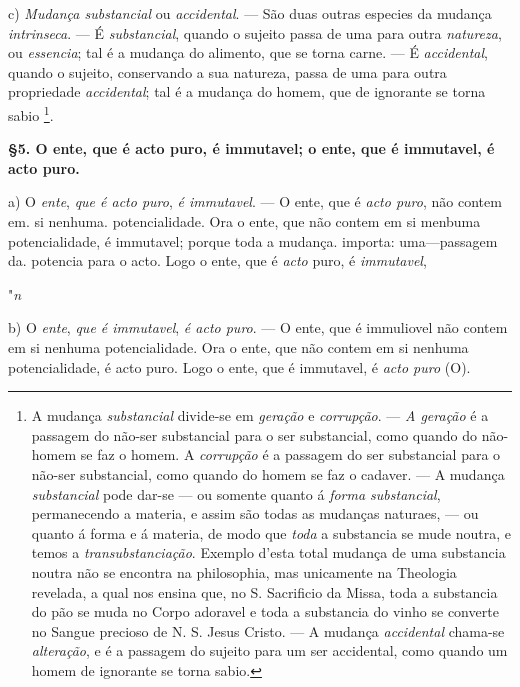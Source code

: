c) \emph{Mudança substancial} ou \emph{accidental}. --- São duas outras especies da mudança \emph{intrinseca}. --- É \emph{substancial}, quando o sujeito passa de uma para outra \emph{natureza}, ou \emph{essencia}; tal é a mudança do alimento, que se torna carne. --- É \emph{accidental}, quando o sujeito, conservando a sua natureza, passa de uma para outra propriedade \emph{accidental}; tal é a mudança do homem, que de ignorante se torna sabio \footnote{A mudança \emph{substancial} divide-se em \emph{geração} e \emph{corrupção}. --- \emph{A geração} é a passagem do não-ser substancial para o ser substancial, como quando do não-homem se faz o homem. A \emph{corrupção} é a passagem do ser substancial para o não-ser substancial, como quando do homem se faz o cadaver. --- A mudança \emph{substancial} pode dar-se --- ou somente quanto á \emph{forma substancial}, permanecendo a materia, e assim são todas as mudanças naturaes, --- ou quanto á forma e á materia, de modo que \emph{toda} a substancia se mude noutra, e temos a \emph{transubstanciação}. Exemplo d'esta total mudança de uma substancia noutra não se encontra na philosophia, mas unicamente na Theologia revelada, a qual nos ensina que, no S. Sacrificio da Missa, toda a substancia do pão se muda no Corpo adoravel e toda a substancia do vinho se converte no Sangue precioso de N. S. Jesus Cristo. --- A mudança \emph{accidental} chama-se \emph{alteração}, e é a passagem do sujeito para um ser accidental, como quando um homem de ignorante se torna sabio.}.

\textbf{§5. O ente, que é acto puro, é immutavel; o ente, que é immutavel, é acto puro.}

 a) O \emph{ente}, \emph{que é acto puro}, \emph{é immutavel}. --- O ente, que é \emph{acto puro}, não contem em. si nenhuma. potencialidade. Ora o ente, que não contem em si menbuma potencialidade, é immutavel; porque toda a mudança. importa: uma---passagem da. potencia para o acto. Logo o ente, que é \emph{acto} puro, é \emph{immutavel},

"\emph{n}

b) O \emph{ente}, \emph{que é immutavel}, \emph{é acto puro}. --- O ente, que é immuliovel não contem em si nenhuma potencialidade. Ora o ente, que não contem em si nenhuma potencialidade, é acto puro. Logo o ente, que é immutavel, é \emph{acto puro} (O).

